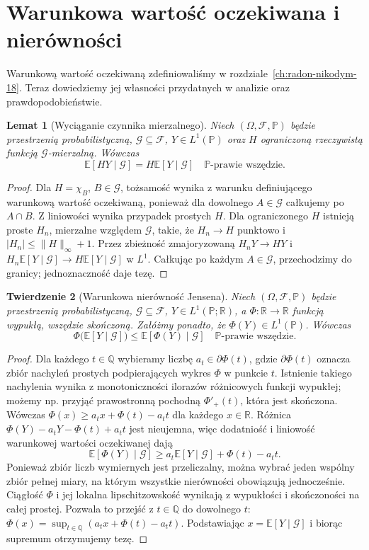 \documentclass[11pt,a4paper,oneside]{book}
\numberwithin{equation}{chapter}
\theoremstyle{plain}
\newtheorem{twierdzenie}{Twierdzenie}[chapter]
\newtheorem{lemat}[twierdzenie]{Lemat}
\theoremstyle{definition}
\theoremstyle{remark}
\begin{document}
\section{Warunkowa wartość oczekiwana i nierówności}
Warunkową wartość oczekiwaną zdefiniowaliśmy w
rozdziale~\ref{ch:radon-nikodym-18}. Teraz dowiedziemy
jej własności przydatnych w analizie oraz prawdopodobieństwie.

\begin{lemat}[Wyciąganie czynnika mierzalnego]
\label{lem:conditional-pullout-19}
Niech $(\Omega,\mathcal F,\mathbb P)$ będzie przestrzenią
probabilistyczną, $\mathcal G\subseteq\mathcal F$,
$Y\in L^1(\mathbb P)$ oraz $H$ ograniczoną rzeczywistą
funkcją $\mathcal G$-mierzalną. Wówczas
\[
 \mathbb E[HY\mid\mathcal G]
 =H\mathbb E[Y\mid\mathcal G]
 \quad\mathbb P\text{-prawie wszędzie}.
\]
\end{lemat}
\begin{proof}
Dla $H=\chi_B$, $B\in\mathcal G$, tożsamość wynika
z warunku definiującego warunkową wartość oczekiwaną,
ponieważ dla dowolnego $A\in\mathcal G$ całkujemy po
$A\cap B$. Z liniowości wynika przypadek prostych $H$.
Dla ograniczonego $H$ istnieją proste $H_n$, mierzalne
względem $\mathcal G$, takie, że $H_n\to H$ punktowo
i $|H_n|\le\|H\|_\infty+1$. Przez zbieżność zmajoryzowaną
$H_nY\to HY$ i $H_n\mathbb E[Y\mid\mathcal G]
\to H\mathbb E[Y\mid\mathcal G]$ w $L^1$.
Całkując po każdym $A\in\mathcal G$, przechodzimy
do granicy; jednoznaczność daje tezę.
\end{proof}

\begin{twierdzenie}[Warunkowa nierówność Jensena]
\label{thm:conditional-jensen-19}
Niech $(\Omega,\mathcal F,\mathbb P)$ będzie przestrzenią
probabilistyczną, $\mathcal G\subseteq\mathcal F$,
$Y\in L^1(\mathbb P;\mathbb R)$, a
$\Phi:\mathbb R\to\mathbb R$ funkcją wypukłą, wszędzie
skończoną. Załóżmy ponadto, że $\Phi(Y)\in L^1(\mathbb P)$.
Wówczas
\[
 \Phi\bigl(\mathbb E[Y\mid\mathcal G]\bigr)
 \le\mathbb E[\Phi(Y)\mid\mathcal G]
 \quad\mathbb P\text{-prawie wszędzie}.
\]
\end{twierdzenie}
\begin{proof}
Dla każdego $t\in\mathbb Q$ wybieramy liczbę
$a_t\in\partial\Phi(t)$, gdzie
$\partial\Phi(t)$ oznacza zbiór nachyleń prostych
podpierających wykres $\Phi$ w punkcie $t$.
Istnienie takiego nachylenia wynika z monotoniczności
ilorazów różnicowych funkcji wypukłej; możemy np. przyjąć
prawostronną pochodną $\Phi'_+(t)$, która jest skończona.
Wówczas
$\Phi(x)\ge a_tx+\Phi(t)-a_tt$ dla każdego $x\in\mathbb R$.
Różnica
$\Phi(Y)-a_tY-\Phi(t)+a_tt$ jest nieujemna,
więc dodatniość i liniowość warunkowej wartości oczekiwanej
dają
\[
\mathbb E[\Phi(Y)\mid\mathcal G]
\ge a_t\mathbb E[Y\mid\mathcal G]+\Phi(t)-a_tt.
\]
Ponieważ zbiór liczb wymiernych jest przeliczalny,
można wybrać jeden wspólny zbiór pełnej miary, na którym
wszystkie nierówności obowiązują jednocześnie.
Ciągłość $\Phi$ i jej lokalna lipschitzowskość
wynikają z wypukłości i skończoności na całej prostej.
Pozwala to przejść z $t\in\mathbb Q$ do dowolnego $t$:
$\Phi(x)=\sup_{t\in\mathbb Q}
(a_tx+\Phi(t)-a_tt)$.
Podstawiając $x=\mathbb E[Y\mid\mathcal G]$
i biorąc supremum otrzymujemy tezę.
\end{proof}
\end{document}
